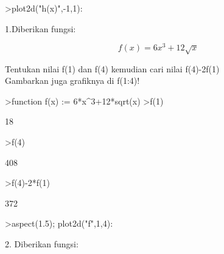 \documentclass[a4paper,10pt]{article}
\begin{document}
\begin{eulernotebook}
\begin{eulercomment}
\begin{eulercomment}
\begin{eulercomment}
\begin{eulercomment}
\begin{eulercomment}
\begin{eulercomment}
\begin{eulercomment}
\begin{eulercomment}
\begin{eulercomment}
\begin{eulercomment}
\begin{eulercomment}
\begin{eulercomment}
\begin{eulercomment}
\begin{eulercomment}
\begin{eulercomment}
\begin{eulercomment}
\begin{euleroutput}
\end{euleroutput}
\begin{eulerprompt}
>plot2d("h(x)",-1,1):
\end{eulerprompt}
\begin{eulercomment}
\end{eulercomment}
\begin{eulercomment}
1.Diberikan fungsi:\\
\end{eulercomment}
\begin{eulerformula}
\[
f(x) = 6x^3+12\sqrt x
\]
\end{eulerformula}
\begin{eulercomment}
Tentukan nilai f(1) dan f(4) kemudian cari nilai f(4)-2f(1)\\
Gambarkan juga grafiknya di f(1:4)!
\end{eulercomment}
\begin{eulerprompt}
>function f(x) := 6*x^3+12*sqrt(x)
>f(1)
\end{eulerprompt}
\begin{euleroutput}
  18
\end{euleroutput}
\begin{eulerprompt}
>f(4)
\end{eulerprompt}
\begin{euleroutput}
  408
\end{euleroutput}
\begin{eulerprompt}
>f(4)-2*f(1)
\end{eulerprompt}
\begin{euleroutput}
  372
\end{euleroutput}
\begin{eulerprompt}
>aspect(1.5); plot2d("f",1,4):
\end{eulerprompt}
\begin{eulercomment}
2. Diberikan fungsi:


\end{eulercomment}
\end{eulercomment}
\end{eulercomment}
\end{eulercomment}
\end{eulercomment}
\end{eulercomment}
\end{eulercomment}
\end{eulercomment}
\end{eulercomment}
\end{eulercomment}
\end{eulercomment}
\end{eulercomment}
\end{eulercomment}
\end{eulercomment}
\end{eulercomment}
\end{eulercomment}
\end{eulercomment}
\end{eulernotebook}
\end{document}
